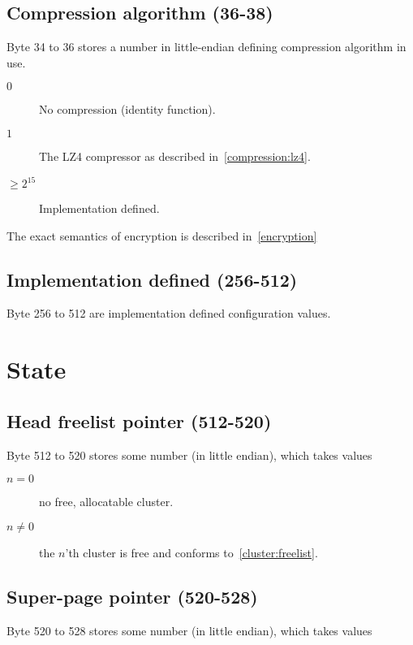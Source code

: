 \documentclass[11pt,a4paper]{report}
\begin{document}
        \subsection{Compression algorithm (36-38)}
        \label{config:compression}
        Byte 34 to 36 stores a number in little-endian defining compression
        algorithm in use.

        \begin{description}
            \item [$0$] No compression (identity function).
            \item [$1$] The LZ4 compressor as
                described
                in~\ref{compression:lz4}.
            \item [$\geq 2^{15}$] Implementation defined.
        \end{description}

        The exact semantics of encryption is described in~\ref{encryption}

        \subsection{Implementation defined (256-512)}
        Byte 256 to 512 are implementation defined configuration values.

    \section{State}
        \subsection{Head freelist pointer (512-520)}
        Byte 512 to 520 stores some number (in little endian), which takes
        values

        \begin{description}
            \item [$n = 0$]    no free, allocatable cluster.
            \item [$n \neq 0$] the $n$'th cluster is free and conforms
                to~\ref{cluster:freelist}.
        \end{description}

        \subsection{Super-page pointer (520-528)}
        Byte 520 to 528 stores some number (in little endian), which takes
        values
\end{document}
